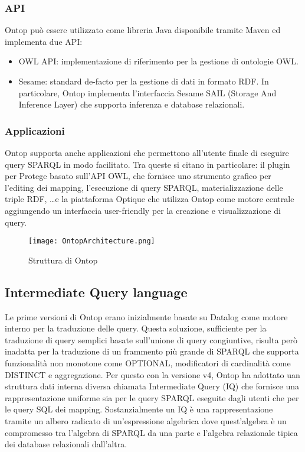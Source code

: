 \subsubsection*{API}
Ontop può essere utilizzato come libreria Java disponibile tramite Maven ed implementa due API:
\begin{itemize}
    \item OWL API: implementazione di riferimento per la gestione di ontologie OWL.
    \item Sesame: standard de-facto per la gestione di dati in formato RDF. In particolare, Ontop implementa l'interfaccia Sesame SAIL (Storage And Inference Layer) che supporta 
        inferenza e database relazionali.
\end{itemize}
\subsubsection*{Applicazioni}
Ontop supporta anche applicazioni che permettono all'utente finale di eseguire query SPARQL in modo facilitato. Tra queste si citano in particolare: il plugin per Protege basato sull'API OWL,
che fornisce uno strumento grafico per l'editing dei mapping, l'esecuzione di query SPARQL, materializzazione delle triple RDF, \dots e la piattaforma Optique che utilizza Ontop come motore centrale 
aggiungendo un interfaccia user-friendly per la creazione e visualizzazione di query.

\begin{figure}[ht]
    \centering
    \texttt{[image: OntopArchitecture.png]}
    \caption{Struttura di Ontop}
    \label{fig:OntopArchitecture}
\end{figure}

\subsection{Intermediate Query language}
\label{sec:ontop_iq}
Le prime versioni di Ontop erano inizialmente basate su Datalog come motore interno per la traduzione delle query. 
Questa soluzione, sufficiente per la traduzione di query semplici basate sull'unione di query congiuntive, risulta però inadatta per la traduzione di un frammento più grande di SPARQL 
che supporta funzionalità non monotone come OPTIONAL, modificatori di cardinalità come DISTINCT e aggregazione. Per questo con la versione v4, Ontop ha adottato uan struttura dati interna diversa 
chiamata Intermediate Query (IQ) che fornisce una rappresentazione uniforme sia per le query SPARQL eseguite dagli utenti che per le query SQL dei mapping.
Sostanzialmente un IQ è una rappresentazione tramite un albero radicato di un'espressione algebrica dove quest'algebra è un compromesso tra l'algebra di SPARQL da una parte e l'algebra relazionale tipica 
dei database relazionali dall'altra. \cite{Ontop}

